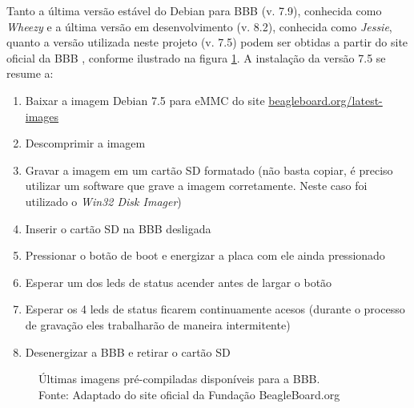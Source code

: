 Tanto a última versão estável do Debian para BBB (v. 7.9), conhecida como \textit{Wheezy} e a última versão em desenvolvimento (v. 8.2), conhecida como \textit{Jessie}, quanto a versão utilizada neste projeto (v. 7.5) podem ser obtidas a partir do site oficial da BBB \cite{bbb_images}, conforme ilustrado na figura \ref{debian_images}. A instalação da versão 7.5 se resume a:

\begin{enumerate}
	\item Baixar a imagem Debian 7.5 para eMMC do site \url{beagleboard.org/latest-images}
	\item Descomprimir a imagem
	\item Gravar a imagem em um cartão \si{\micro}SD formatado (não basta copiar, é preciso utilizar um software que grave a imagem corretamente. Neste caso foi utilizado o \textit{Win32 Disk Imager})
	\item Inserir o cartão \si{\micro}SD na BBB desligada
	\item Pressionar o botão de boot e energizar a placa com ele ainda pressionado
	\item Esperar um dos leds de status acender antes de largar o botão
	\item Esperar os 4 leds de status ficarem continuamente acesos (durante o processo de gravação eles trabalharão de maneira intermitente)
	\item Desenergizar a BBB e retirar o cartão \si{\micro}SD
\end{enumerate}
 
 \newpage
 
\begin{figure}[H]
	\centering
	\captionsetup{justification=centering}
	\caption[Últimas imagens pré-compiladas disponíveis para a BBB]{Últimas imagens pré-compiladas disponíveis para a BBB. \\Fonte: Adaptado do site oficial da Fundação BeagleBoard.org\protect\footnotemark}
	\label{debian_images}
\end{figure}

